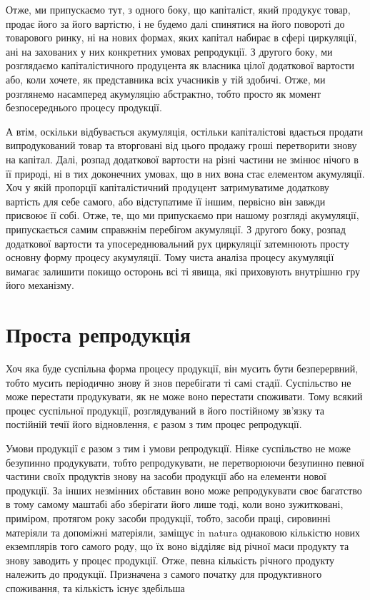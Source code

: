 Отже, ми припускаємо тут, з одного боку, що капіталіст,
який продукує товар, продає його за його вартістю, і не будемо
далі спинятися на його повороті до товарового ринку, ні на
нових формах, яких капітал набирає в сфері циркуляції, ані на
захованих у них конкретних умовах репродукції. З другого боку,
ми розглядаємо капіталістичного продуцента як власника цілої
додаткової вартости або, коли хочете, як представника всіх учасників
у тій здобичі. Отже, ми розглянемо насамперед акумуляцію
абстрактно, тобто просто як момент безпосереднього процесу
продукції.

А втім, оскільки відбувається акумуляція, остільки капіталістові
вдається продати випродукований товар та вторговані
від цього продажу гроші перетворити знову на капітал. Далі,
розпад додаткової вартости на різні частини не змінює нічого в
її природі, ні в тих доконечних умовах, що в них вона стає елементом
акумуляції. Хоч у якій пропорції капіталістичний продуцент
затримуватиме додаткову вартість для себе самого, або
відступатиме її іншим, первісно він завжди присвоює її собі.
Отже, те, що ми припускаємо при нашому розгляді акумуляції,
припускається самим справжнім перебігом акумуляції. З другого
боку, розпад додаткової вартости та упосереднювальний рух циркуляції
затемнюють просту основну форму процесу акумуляції.
Тому чиста аналіза процесу акумуляції вимагає залишити покищо
осторонь всі ті явища, які приховують внутрішню гру його
механізму.

\section{Проста репродукція}

Хоч яка буде суспільна форма процесу продукції, він мусить
бути безперервний, тобто мусить періодично знову й знов перебігати
ті самі стадії. Суспільство не може перестати продукувати,
як не може воно перестати споживати. Тому всякий процес
суспільної продукції, розглядуваний в його постійному зв’язку
та постійній течії його відновлення, є разом з тим процес репродукції.

Умови продукції є разом з тим і умови репродукції. Ніяке
суспільство не може безупинно продукувати, тобто репродукувати,
не перетворюючи безупинно певної частини своїх продуктів
знову на засоби продукції або на елементи нової продукції.
За інших незмінних обставин воно може репродукувати своє багатство
в тому самому маштабі або зберігати його лише тоді, коли
воно зужитковані, приміром, протягом року засоби продукції,
тобто, засоби праці, сировинні матеріяли та допоміжні матеріяли,
заміщує in natura однаковою кількістю нових екземплярів того
самого роду, що їх воно відділяє від річної маси продукту та
знову заводить у процес продукції. Отже, певна кількість річного
продукту належить до продукції. Призначена з самого початку
для продуктивного споживання, та кількість існує здебільша
\parbreak{}  %
